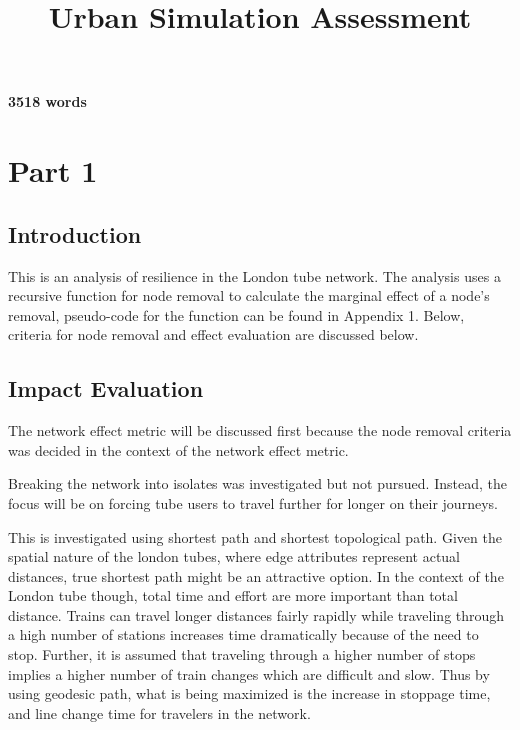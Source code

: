 \documentclass[11pt]{article} %
\title{\vspace{-3.0cm}Urban Simulation Assessment}
\begin{document}
\maketitle


\textbf{3518 words}


\section{Part 1}



\subsection{Introduction}

This is an analysis of resilience in the London tube network. The analysis uses a recursive function for node removal to calculate the marginal effect of a node's removal, pseudo-code for the function can be found in Appendix 1. Below, criteria for node removal and effect evaluation are discussed below. 


\subsection{Impact Evaluation}
The network effect metric will be discussed first because the node removal criteria was decided in the context of the network effect metric.

Breaking the network into isolates was investigated but not pursued. Instead, the focus will be on forcing tube users to travel further for longer on their journeys. 

This is investigated using shortest path and shortest topological path. Given the spatial nature of the london tubes, where edge attributes represent actual distances, true shortest path might be an attractive option. In the context of the London tube though, total time and effort are more important than total distance. Trains can travel longer distances fairly rapidly while traveling through a high number of stations increases time dramatically because of the need to stop. Further, it is assumed that traveling through a higher number of stops implies a higher number of train changes which are difficult and slow. Thus by using geodesic path, what is being maximized is the increase in stoppage time, and line change time for travelers in the network.
\end{document}
